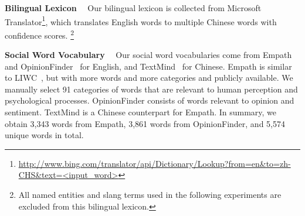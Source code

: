 \textbf{Bilingual Lexicon}~~
\label{sec:blpre}
Our bilingual lexicon is collected from Microsoft Translator\footnote{\scriptsize{\url{http://www.bing.com/translator/api/Dictionary/Lookup?from=en&to=zh-CHS&text=<input_word>}}}, which translates English words to multiple
Chinese words with confidence scores. 
\footnote{All named entities and slang terms used
	in the following experiments are excluded from this bilingual lexicon.}



\textbf{Social Word Vocabulary}~~
\label{sec:sv}
Our social word vocabularies come from 
Empath~\cite{fast2016empath} and OpinionFinder~\cite{choi2005identifying} 
for English, and TextMind~\cite{gao2013developing} for Chinese.
Empath is similar to LIWC~\cite{pennebaker2001linguistic},
but with more words and more categories and publicly available. 
We manually select 91 categories of words that are 
relevant to human perception and psychological processes. 
OpinionFinder consists of words relevant to opinion and sentiment. 
TextMind is a Chinese counterpart for Empath.
%
In summary, we obtain 3,343 words from Empath, 3,861 words from OpinionFinder, 
and 5,574 unique words in total. 




